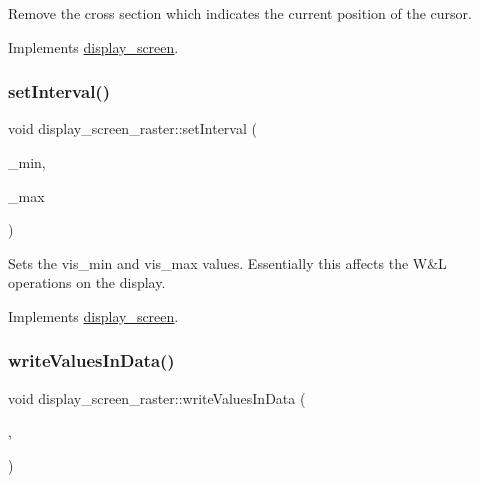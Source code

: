Remove the cross section which indicates the current position of the cursor. 

Implements \mbox{\hyperlink{classdisplay__screen_aedda58c57969f054fb9bedd1ed01b62c}{display\+\_\+screen}}.

\mbox{\label{classdisplay__screen__raster_aacbbdf19c624ecb6f09c32c27b6f4132}} 
\subsubsection{\texorpdfstring{set\+Interval()}{setInterval()}}
{\footnotesize\ttfamily void display\+\_\+screen\+\_\+raster\+::set\+Interval (\begin{DoxyParamCaption}\item[{const double \&}]{\+\_\+min,  }\item[{const double \&}]{\+\_\+max }\end{DoxyParamCaption})\hspace{0.3cm}{\ttfamily [virtual]}}

Sets the vis\+\_\+min and vis\+\_\+max values. Essentially this affects the W\&L operations on the display. 

Implements \mbox{\hyperlink{classdisplay__screen}{display\+\_\+screen}}.

\mbox{\label{classdisplay__screen__raster_a7cfddde7af1d6bb730a43b5cd13af34f}} 
\subsubsection{\texorpdfstring{write\+Values\+In\+Data()}{writeValuesInData()}}
{\footnotesize\ttfamily void display\+\_\+screen\+\_\+raster\+::write\+Values\+In\+Data (\begin{DoxyParamCaption}\item[{const stir\+::\+Proj\+Matrix\+Elems\+For\+One\+Bin \&}]{,  }\item[{const float \&}]{ }\end{DoxyParamCaption})\hspace{0.3cm}{\ttfamily [virtual]}}

